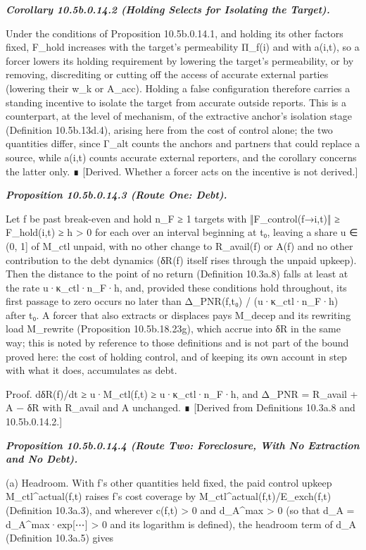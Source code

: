 \documentclass[
]{article}
\begin{document}
\emph{\textbf{Corollary 10.5b.0.14.2 (Holding Selects for Isolating the
Target).}}

Under the conditions of Proposition 10.5b.0.14.1, and holding its other
factors fixed, F\_hold increases with the target's permeability Π\_f(i)
and with a(i,t), so a forcer lowers its holding requirement by lowering
the target's permeability, or by removing, discrediting or cutting off
the access of accurate external parties (lowering their w\_k or A\_acc).
Holding a false configuration therefore carries a standing incentive to
isolate the target from accurate outside reports. This is a counterpart,
at the level of mechanism, of the extractive anchor's isolation stage
(Definition 10.5b.13d.4), arising here from the cost of control alone;
the two quantities differ, since Γ\_alt counts the anchors and partners
that could replace a source, while a(i,t) counts accurate external
reporters, and the corollary concerns the latter only. ∎ {[}Derived.
Whether a forcer acts on the incentive is not derived.{]}

\emph{\textbf{Proposition 10.5b.0.14.3 (Route One: Debt).}}

Let f be past break-even and hold n\_F ≥ 1 targets with
‖F\_control(f→i,t)‖ ≥ F\_hold(i,t) ≥ h \textgreater{} 0 for each over an
interval beginning at t₀, leaving a share u ∈ (0, 1{]} of M\_ctl unpaid,
with no other change to R\_avail(f) or A(f) and no other contribution to
the debt dynamics (δR(f) itself rises through the unpaid upkeep). Then
the distance to the point of no return (Definition 10.3a.8) falls at
least at the rate u·κ\_ctl·n\_F·h, and, provided these conditions hold
throughout, its first passage to zero occurs no later than Δ\_PNR(f,t₀)
/ (u·κ\_ctl·n\_F·h) after t₀. A forcer that also extracts or displaces
pays M\_decep and its rewriting load M\_rewrite (Proposition
10.5b.18.23g), which accrue into δR in the same way; this is noted by
reference to those definitions and is not part of the bound proved here:
the cost of holding control, and of keeping its own account in step with
what it does, accumulates as debt.

Proof. dδR(f)/dt ≥ u·M\_ctl(f,t) ≥ u·κ\_ctl·n\_F·h, and Δ\_PNR =
R\_avail + A − δR with R\_avail and A unchanged. ∎ {[}Derived from
Definitions 10.3a.8 and 10.5b.0.14.2.{]}

\emph{\textbf{Proposition 10.5b.0.14.4 (Route Two: Foreclosure, With No
Extraction and No Debt).}}

(a) Headroom. With f's other quantities held fixed, the paid control
upkeep M\_ctl\^{}actual(f,t) raises f's cost coverage by
M\_ctl\^{}actual(f,t)/E\_exch(f,t) (Definition 10.3a.3), and wherever
c(f,t) \textgreater{} 0 and d\_A\^{}max \textgreater{} 0 (so that d\_A =
d\_A\^{}max·exp{[}⋯{]} \textgreater{} 0 and its logarithm is defined),
the headroom term of d\_A (Definition 10.3a.5) gives
\end{document}
